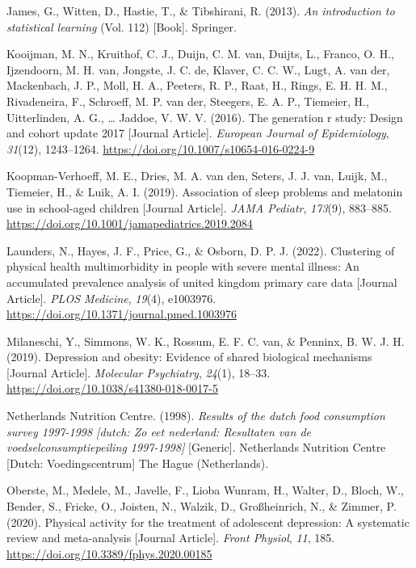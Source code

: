 \documentclass[
  letterpaper,
  DIV=11,
  numbers=noendperiod]{scrreport}
\newlength{\cslhangindent}
\newenvironment{CSLReferences}[2] %
 {\begin{list}{}{%
  \setlength{\itemindent}{0pt}
  \setlength{\leftmargin}{0pt}
  \setlength{\parsep}{0pt}
  \ifodd #1
   \setlength{\leftmargin}{\cslhangindent}
   \setlength{\itemindent}{-1\cslhangindent}
  \fi
  \setlength{\itemsep}{#2\baselineskip}}}
 {\end{list}}
\begin{document}
\begin{CSLReferences}{1}{0}
James, G., Witten, D., Hastie, T., \& Tibshirani, R. (2013). \emph{An
introduction to statistical learning} (Vol. 112) {[}Book{]}. Springer.

Kooijman, M. N., Kruithof, C. J., Duijn, C. M. van, Duijts, L., Franco,
O. H., Ijzendoorn, M. H. van, Jongste, J. C. de, Klaver, C. C. W., Lugt,
A. van der, Mackenbach, J. P., Moll, H. A., Peeters, R. P., Raat, H.,
Rings, E. H. H. M., Rivadeneira, F., Schroeff, M. P. van der, Steegers,
E. A. P., Tiemeier, H., Uitterlinden, A. G., \ldots{} Jaddoe, V. W. V.
(2016). The generation r study: Design and cohort update 2017 {[}Journal
Article{]}. \emph{European Journal of Epidemiology}, \emph{31}(12),
1243--1264. \url{https://doi.org/10.1007/s10654-016-0224-9}

Koopman-Verhoeff, M. E., Dries, M. A. van den, Seters, J. J. van, Luijk,
M., Tiemeier, H., \& Luik, A. I. (2019). Association of sleep problems
and melatonin use in school-aged children {[}Journal Article{]}.
\emph{JAMA Pediatr}, \emph{173}(9), 883--885.
\url{https://doi.org/10.1001/jamapediatrics.2019.2084}

Launders, N., Hayes, J. F., Price, G., \& Osborn, D. P. J. (2022).
Clustering of physical health multimorbidity in people with severe
mental illness: An accumulated prevalence analysis of united kingdom
primary care data {[}Journal Article{]}. \emph{PLOS Medicine},
\emph{19}(4), e1003976.
\url{https://doi.org/10.1371/journal.pmed.1003976}

Milaneschi, Y., Simmons, W. K., Rossum, E. F. C. van, \& Penninx, B. W.
J. H. (2019). Depression and obesity: Evidence of shared biological
mechanisms {[}Journal Article{]}. \emph{Molecular Psychiatry},
\emph{24}(1), 18--33. \url{https://doi.org/10.1038/s41380-018-0017-5}

Netherlands Nutrition Centre. (1998). \emph{Results of the dutch food
consumption survey 1997-1998 {[}dutch: Zo eet nederland: Resultaten van
de voedselconsumptiepeiling 1997-1998{]}} {[}Generic{]}. Netherlands
Nutrition Centre {[}Dutch: Voedingscentrum{]} The Hague (Netherlands).

Oberste, M., Medele, M., Javelle, F., Lioba Wunram, H., Walter, D.,
Bloch, W., Bender, S., Fricke, O., Joisten, N., Walzik, D.,
Großheinrich, N., \& Zimmer, P. (2020). Physical activity for the
treatment of adolescent depression: A systematic review and
meta-analysis {[}Journal Article{]}. \emph{Front Physiol}, \emph{11},
185. \url{https://doi.org/10.3389/fphys.2020.00185}


\end{CSLReferences}
\end{document}
